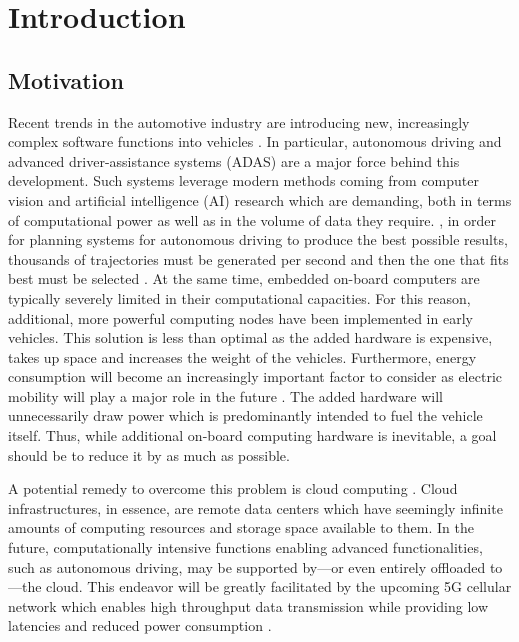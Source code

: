 
\chapter{Introduction}\label{chapter:introduction}


\section{Motivation}
Recent trends in the automotive industry are introducing new, increasingly complex software functions into vehicles \cite{broy2006challenges}. In particular, autonomous driving and advanced driver-assistance systems (ADAS) are a major force behind this development. Such systems leverage modern methods coming from computer vision and artificial intelligence (AI) research which are demanding, both in terms of computational power as well as in the volume of data they require. \Eg , in order for planning systems for autonomous driving to produce the best possible results, thousands of trajectories must be generated per second and then the one that fits best must be selected \cite{levinson2011towards}. At the same time, embedded on-board computers are typically severely limited in their computational capacities. For this reason, additional, more powerful computing nodes have been implemented in early vehicles. This solution is less than optimal as the added hardware is expensive, takes up space and increases the weight of the vehicles. Furthermore, energy consumption will become an increasingly important factor to consider as electric mobility will play a major role in the future  . The added hardware will unnecessarily draw power which is predominantly intended to fuel the vehicle itself. Thus, while additional on-board computing hardware is inevitable, a goal should be to reduce it by as much as possible. 

A potential remedy to overcome this problem is cloud computing \cite{mell2011nist}. Cloud infrastructures, in essence, are remote data centers which have seemingly infinite amounts of computing resources and storage space available to them. In the future, computationally intensive functions enabling advanced functionalities, such as autonomous driving, may be supported by---or even entirely offloaded to---the cloud. This endeavor will be greatly facilitated by the upcoming 5G cellular network which enables high throughput data transmission while providing low latencies and reduced power consumption \cite{andrews2014will}.

